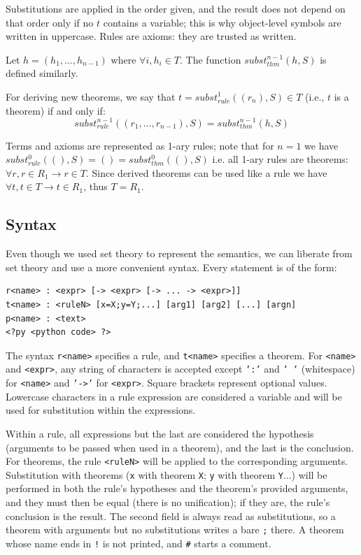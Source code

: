 \documentclass{article}
\begin{document}
Substitutions are applied in the order given, and the result does not depend on that order only if no $t$ contains a variable; this is why object-level symbols are written in uppercase. Rules are axioms: they are trusted as written.

Let $h = (h_1, \ldots, h_{n-1})$ where $\forall i, h_i \in T$. The function $subst_{thm}^{n-1}(h, S)$ is defined similarly.

For deriving new theorems, we say that $t = subst_{rule}^1((r_n), S) \in T$ (i.e., $t$ is a theorem) if and only if:
$$subst_{rule}^{n-1}((r_1, \ldots, r_{n-1}), S) = subst_{thm}^{n-1}(h, S)$$

Terms and axioms are represented as 1-ary rules; note that for $n = 1$ we have $subst_{rule}^0((), S) = () = subst_{thm}^0((), S)$ i.e. all 1-ary rules are theorems: $\forall r, r \in R_1 \to r \in T$. Since derived theorems can be used like a rule we have $\forall t, t \in T \to t \in R_1$, thus $T = R_1$.

\subsection{Syntax}

Even though we used set theory\cite{b6} to represent the semantics, we can liberate from set theory and use a more convenient syntax. Every statement is of the form:

\begin{verbatim}
r<name> : <expr> [-> <expr> [-> ... -> <expr>]]
t<name> : <ruleN> [x=X;y=Y;...] [arg1] [arg2] [...] [argn]
p<name> : <text>
<?py <python code> ?>
\end{verbatim}

The syntax \texttt{r<name>} specifies a rule, and \texttt{t<name>} specifies a theorem. For \texttt{<name>} and \texttt{<expr>}, any string of characters is accepted except \texttt{':'} and \texttt{' '} (whitespace) for \texttt{<name>} and \texttt{'->'} for \texttt{<expr>}. Square brackets represent optional values. Lowercase characters in a rule expression are considered a variable and will be used for substitution within the expressions.

Within a rule, all expressions but the last are considered the hypothesis (arguments to be passed when used in a theorem), and the last is the conclusion. For theorems, the rule \texttt{<ruleN>} will be applied to the corresponding arguments. Substitution with theorems (\texttt{x} with theorem \texttt{X}; \texttt{y} with theorem \texttt{Y}...) will be performed in both the rule's hypotheses and the theorem's provided arguments, and they must then be equal (there is no unification); if they are, the rule's conclusion is the result. The second field is always read as substitutions, so a theorem with arguments but no substitutions writes a bare \texttt{;} there. A theorem whose name ends in \texttt{!} is not printed, and \texttt{\#} starts a comment.
\end{document}
